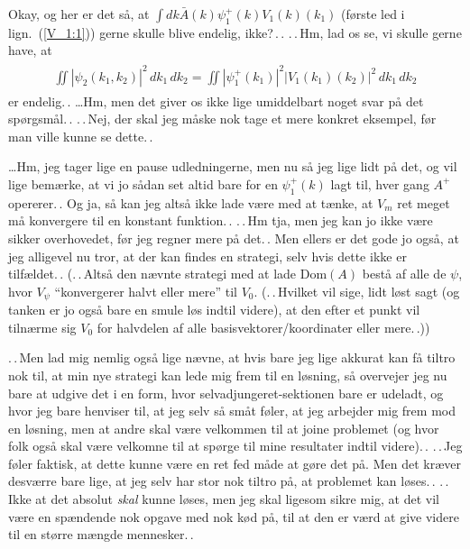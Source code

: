 \documentclass{report}
\begin{document}
Okay, og her er det så, at $\int dk \bar{A}(k)\psi_1^+(k) V_1(k)(k_1)$ (første led i lign.\ (\ref{V_1:1})) gerne skulle blive endelig, ikke?\,.\,. .\,.\,Hm, lad os se, vi skulle gerne have, at
\begin{align}
\begin{aligned}
	\iint  |\psi_2(k_1, k_2)|^2\,dk_1\,dk_2 = \iint |\psi_1^+(k_1)|^2 |V_1(k_1)(k_2)|^2 \,dk_1\,dk_2 
\end{aligned}
\end{align}
er endelig.\,. \ldots Hm, men det giver os ikke lige umiddelbart noget svar på det spørgsmål.\,. .\,.\,Nej, der skal jeg måske nok tage et mere konkret eksempel, før man ville kunne se dette.\,. 


\ldots Hm, jeg tager lige en pause udledningerne, men nu så jeg lige lidt på det, og vil lige bemærke, at vi jo sådan set altid bare for en $\psi_1^+(k)$ lagt til, hver gang $A^+$ opererer.\,. Og ja, så kan jeg altså ikke lade være med at tænke, at $V_m$ ret meget må konvergere til en konstant funktion.\,. .\,.\,Hm tja, men jeg kan jo ikke være sikker overhovedet, før jeg regner mere på det.\,. Men ellers er det gode jo også, at jeg alligevel nu tror, at der kan findes en strategi, selv hvis dette ikke er tilfældet.\,. (.\,.\,Altså den nævnte strategi med at lade Dom$(A)$ bestå af alle de $\psi$, hvor $V_\psi$ ``konvergerer halvt eller mere'' til $V_0$. (.\,.\,Hvilket vil sige, lidt løst sagt (og tanken er jo også bare en smule løs indtil videre), at den efter et punkt vil tilnærme sig $V_0$ for halvdelen af alle basisvektorer/koordinater eller mere.\,.)) 

.\,.\,Men lad mig nemlig også lige nævne, at hvis bare jeg lige akkurat kan få tiltro nok til, at min nye strategi kan lede mig frem til en løsning, så overvejer jeg nu bare at udgive det i en form, hvor selvadjungeret-sektionen bare er udeladt, og hvor jeg bare henviser til, at jeg selv så småt føler, at jeg arbejder mig frem mod en løsning, men at andre skal være velkommen til at joine problemet (og hvor folk også skal være velkomne til at spørge til mine resultater indtil videre).\,. .\,.\,Jeg føler faktisk, at dette kunne være en ret fed måde at gøre det på. Men det kræver desværre bare lige, at jeg selv har stor nok tiltro på, at problemet kan løses.\,. .\,.\,Ikke at det absolut \emph{skal} kunne løses, men jeg skal ligesom sikre mig, at det vil være en spændende nok opgave med nok kød på, til at den er værd at give videre til en større mængde mennesker.\,. 
\end{document}
